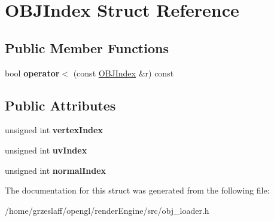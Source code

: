 \hypertarget{structOBJIndex}{\section{O\-B\-J\-Index Struct Reference}
\label{structOBJIndex}
}
\subsection*{Public Member Functions}
\begin{DoxyCompactItemize}
\item 
\hypertarget{structOBJIndex_aa10893321f37dfaf5a7b71b8a9865542}{bool {\bfseries operator$<$} (const \hyperlink{structOBJIndex}{O\-B\-J\-Index} \&r) const }\label{structOBJIndex_aa10893321f37dfaf5a7b71b8a9865542}

\end{DoxyCompactItemize}
\subsection*{Public Attributes}
\begin{DoxyCompactItemize}
\item 
\hypertarget{structOBJIndex_acf4def56e1a20b00fa183e6a633c97a1}{unsigned int {\bfseries vertex\-Index}}\label{structOBJIndex_acf4def56e1a20b00fa183e6a633c97a1}

\item 
\hypertarget{structOBJIndex_a2789d1a6ace791055e8627ad09d9c68c}{unsigned int {\bfseries uv\-Index}}\label{structOBJIndex_a2789d1a6ace791055e8627ad09d9c68c}

\item 
\hypertarget{structOBJIndex_a9af2bc243ac910fe1e6596aa85aa4ae6}{unsigned int {\bfseries normal\-Index}}\label{structOBJIndex_a9af2bc243ac910fe1e6596aa85aa4ae6}

\end{DoxyCompactItemize}


The documentation for this struct was generated from the following file\-:\begin{DoxyCompactItemize}
\item 
/home/grzeslaff/opengl/render\-Engine/src/obj\-\_\-loader.\-h\end{DoxyCompactItemize}
